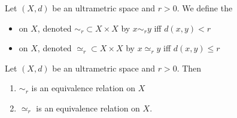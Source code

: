 \documentclass{book}
\begin{document}
\begin{defn}
	Let $(X,d)$ be an ultrametric space and $r > 0$. We define the 
	\begin{itemize}
		\item {} on $X$, denoted $\sim_r \subset X \times X$ by $x \sim_r y$ iff $d(x,y) < r$
		\item {} on $X$, denoted $\simeq_r \subset X \times X$ by $x \simeq_r y$ iff $d(x,y) \leq r$
	\end{itemize}
\end{defn}

\begin{ex}
	Let $(X,d)$ be an ultrametric space and $r > 0$. Then
	\begin{enumerate}
		\item ${\sim_r}$ is an equivalence relation on $X$
		\item ${\simeq_r}$ is an equivalence relation on $X$. 
	\end{enumerate}
\end{ex}
\end{document}
